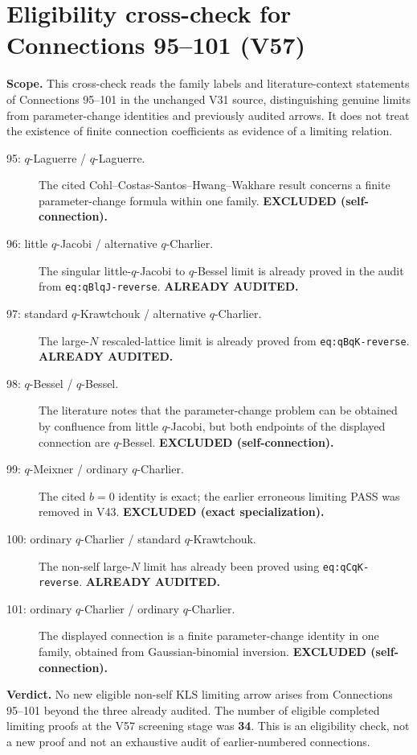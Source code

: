 \documentclass[11pt]{article}
\begin{document}
\section{Eligibility cross-check for Connections 95--101 (V57)}
\noindent\textbf{Scope.} This cross-check reads the family labels and literature-context statements of Connections 95--101 in the unchanged V31 source, distinguishing genuine limits from parameter-change identities and previously audited arrows. It does not treat the existence of finite connection coefficients as evidence of a limiting relation.
\begin{description}
\item[95: $q$-Laguerre / $q$-Laguerre.] The cited Cohl--Costas-Santos--Hwang--Wakhare result concerns a finite parameter-change formula within one family. \textbf{EXCLUDED (self-connection).}
\item[96: little $q$-Jacobi / alternative $q$-Charlier.] The singular little-$q$-Jacobi to $q$-Bessel limit is already proved in the audit from \texttt{eq:qBlqJ-reverse}. \textbf{ALREADY AUDITED.}
\item[97: standard $q$-Krawtchouk / alternative $q$-Charlier.] The large-$N$ rescaled-lattice limit is already proved from \texttt{eq:qBqK-reverse}. \textbf{ALREADY AUDITED.}
\item[98: $q$-Bessel / $q$-Bessel.] The literature notes that the parameter-change problem can be obtained by confluence from little $q$-Jacobi, but both endpoints of the displayed connection are $q$-Bessel. \textbf{EXCLUDED (self-connection).}
\item[99: $q$-Meixner / ordinary $q$-Charlier.] The cited $b=0$ identity is exact; the earlier erroneous limiting PASS was removed in V43. \textbf{EXCLUDED (exact specialization).}
\item[100: ordinary $q$-Charlier / standard $q$-Krawtchouk.] The non-self large-$N$ limit has already been proved using \texttt{eq:qCqK-reverse}. \textbf{ALREADY AUDITED.}
\item[101: ordinary $q$-Charlier / ordinary $q$-Charlier.] The displayed connection is a finite parameter-change identity in one family, obtained from Gaussian-binomial inversion. \textbf{EXCLUDED (self-connection).}
\end{description}
\noindent\textbf{Verdict.} No new eligible non-self KLS limiting arrow arises from Connections 95--101 beyond the three already audited. The number of eligible completed limiting proofs at the V57 screening stage was \textbf{34}. This is an eligibility check, not a new proof and not an exhaustive audit of earlier-numbered connections.
\end{document}
